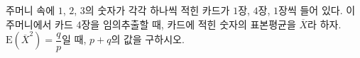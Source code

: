 주머니 속에 $1$, $2$, $3$의 숫자가 각각 하나씩 적힌 카드가 $1$장, $4$장, $1$장씩 들어 있다. 이 주머니에서 카드 $4$장을 임의추출할 때, 카드에 적힌 숫자의 표본평균을 $\overline{X}$라 하자. $\mathrm{E}(\overline{X}^2)=\dfrac{q}{p}$일 때, $p+q$의 값을 구하시오. 
